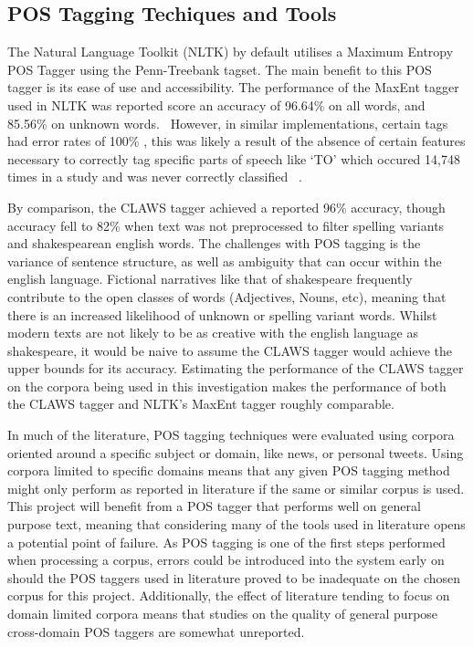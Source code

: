 \documentclass[10pt]{report}
\begin{document}
\subsection{POS Tagging Techiques and Tools}
The Natural Language Toolkit (NLTK) by default utilises a Maximum Entropy POS Tagger using the Penn-Treebank tagset. The main benefit to this POS tagger is its ease of use and accessibility. The performance of the MaxEnt tagger used in NLTK was reported score an accuracy of 96.64\% on all words, and 85.56\% on unknown words.~\cite{Ratnaparkhi1996-oa} However, in similar implementations, certain tags had error rates of 100\% , this was likely a result of the absence of certain features necessary to correctly tag specific parts of speech like ‘TO’ which occured 14,748 times in a study and was never correctly classified ~\cite{Malecha2010-fl}. 

By comparison, the CLAWS tagger achieved a reported 96\% accuracy, though accuracy fell to 82\% when text was not preprocessed to filter spelling variants and shakespearean english words. The challenges with POS tagging is the variance of sentence structure, as well as ambiguity that can occur within the english language. Fictional narratives like that of shakespeare frequently contribute to the open classes of words (Adjectives, Nouns, etc), meaning that there is an increased likelihood of unknown or spelling variant words. Whilst modern texts are not likely to be as creative with the english language as shakespeare, it would be naive to assume the CLAWS tagger would achieve the upper bounds for its accuracy. Estimating the performance of the CLAWS tagger on the corpora being used in this investigation makes the performance of both the CLAWS tagger and NLTK’s MaxEnt tagger roughly comparable.

In much of the literature, POS tagging techniques were evaluated using corpora oriented around a specific subject or domain, like news, or personal tweets. Using corpora limited to specific domains means that any given POS tagging method might only perform as reported in literature if the same or similar corpus is used. This project will benefit from a POS tagger that performs well on general purpose text, meaning that considering many of the tools used in literature opens a potential point of failure. As POS tagging is one of the first steps performed when processing a corpus, errors could be introduced into the system early on should the POS taggers used in literature proved to be inadequate on the chosen corpus for  this project. Additionally, the effect of literature tending to focus on domain limited corpora means that studies on the quality of general purpose cross-domain POS taggers are somewhat unreported.
\end{document}
